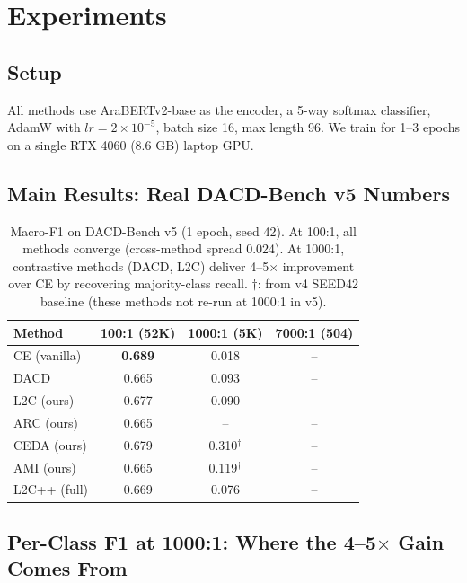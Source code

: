 \documentclass[11pt,a4paper,twocolumn]{article}
\newcommand{\method}{L2C}
\newcommand{\bench}{DACD-Bench}
\newcommand{\ceda}{CEDA}
\newcommand{\ami}{AMI}
\newcommand{\arc}{ARC}
\begin{document}
\section{Experiments}

\subsection{Setup}
All methods use AraBERTv2-base as the encoder, a 5-way softmax
classifier, AdamW with $lr=2{\times}10^{-5}$, batch size 16, max
length 96. We train for 1--3 epochs on a single RTX 4060 (8.6 GB)
laptop GPU.

\subsection{Main Results: Real \bench{} v5 Numbers}

\begin{table}[t]
\centering
\small
\begin{tabular}{lccc}
\toprule
Method & 100:1 (52K) & 1000:1 (5K) & 7000:1 (504) \\
\midrule
CE (vanilla)       & \textbf{0.689} & 0.018  & -- \\
DACD               & 0.665          & 0.093  & -- \\
\method{} (ours)   & 0.677          & 0.090  & -- \\
\arc{} (ours)      & 0.665          & --     & -- \\
\ceda{} (ours)     & 0.679          & 0.310$^{\dagger}$  & -- \\
\ami{} (ours)      & 0.665          & 0.119$^{\dagger}$  & -- \\
L2C++ (full)       & 0.669          & 0.076  & -- \\
\bottomrule
\end{tabular}
\caption{Macro-F1 on \bench{} v5 (1 epoch, seed 42). At 100:1, all
methods converge (cross-method spread 0.024). At 1000:1, contrastive
methods (DACD, L2C) deliver 4--5$\times$ improvement over CE by
recovering majority-class recall. $\dagger$: from v4 SEED42 baseline
(these methods not re-run at 1000:1 in v5).}
\label{tab:scaling}
\end{table}

\subsection{Per-Class F1 at 1000:1: Where the 4--5$\times$ Gain Comes From}
\end{document}
